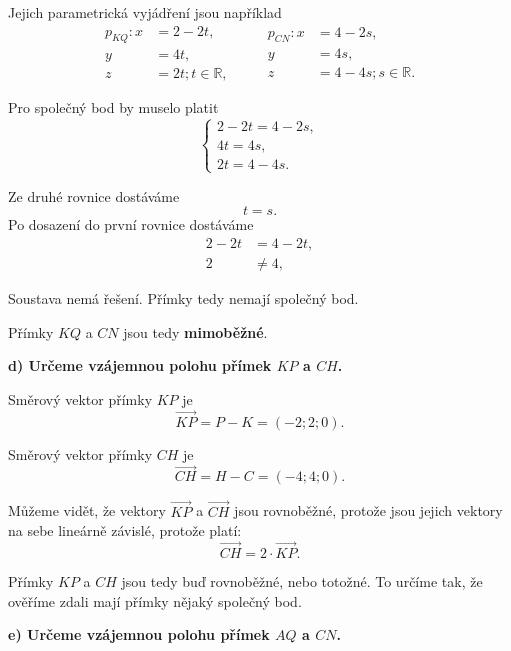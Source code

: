 \begin{example}
    Jejich parametrická vyjádření jsou například
    \[
        \begin{aligned}
            p_{KQ}: x&=2-2t,\\
                    y&=4t,\\
                    z&=2t; t\in\mathbb{R},
        \end{aligned}
        \qquad
        \begin{aligned}
            p_{CN}: x&=4-2s,\\
                    y&=4s,\\
                    z&=4-4s; s\in\mathbb{R}.
        \end{aligned}
    \]

    Pro společný bod by muselo platit
    \[
        \begin{cases}
            2-2t=4-2s,\\
            4t=4s,\\
            2t=4-4s.
        \end{cases}
    \]

    Ze druhé rovnice dostáváme
    \[
        t=s.
    \]
    Po dosazení do první rovnice dostáváme
    \begin{align*}
        2-2t&=4-2t,\\
        2&\neq4,
    \end{align*}

    Soustava nemá řešení. Přímky tedy nemají společný bod.

    Přímky $KQ$ a $CN$ jsou tedy \textbf{mimoběžné}.


    \textbf{d) Určeme vzájemnou polohu přímek $KP$ a $CH$.}

    Směrový vektor přímky $KP$ je
    \[
        \overrightarrow{KP}
        =P-K
        =(-2;2;0).
    \]

    Směrový vektor přímky $CH$ je
    \[
        \overrightarrow{CH}
        =H-C
        =(-4;4;0).
    \]

    Můžeme vidět, že vektory $\overrightarrow{KP}$ a $\overrightarrow{CH}$ jsou rovnoběžné,
    protože jsou jejich vektory na sebe lineárně závislé, protože platí:
    \[
        \overrightarrow{CH} = 2\cdot\overrightarrow{KP}.
    \]

    Přímky $KP$ a $CH$ jsou tedy buď rovnoběžné, nebo totožné. To určíme tak, 
    že ověříme zdali mají přímky nějaký společný bod.

    

        \textbf{e) Určeme vzájemnou polohu přímek $AQ$ a $CN$.}


\end{example}
